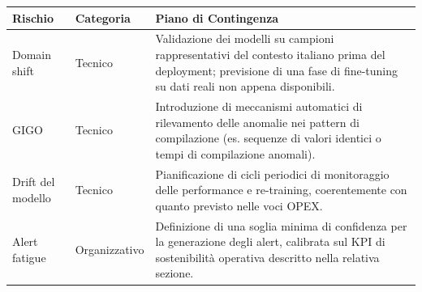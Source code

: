 \vspace{0.3cm}
\begin{table}[h]
    \centering
    \renewcommand{\arraystretch}{1.5}
    \small
    \begin{tabular}{|p{}|p{}|p{}|}
        \hline
        \textbf{Rischio}           & \textbf{Categoria} & \textbf{Piano di Contingenza}                                                                                                                                                                                                                                                                                                                                                                                                              \\
        \hline
        Domain shift               & Tecnico            & Validazione dei modelli su campioni rappresentativi del contesto italiano prima del deployment; previsione di una fase di fine-tuning su dati reali non appena disponibili.                                                                                                                                                                                                                                                                \\
        \hline
        GIGO                       & Tecnico            & Introduzione di meccanismi automatici di rilevamento delle anomalie nei pattern di compilazione (es. sequenze di valori identici o tempi di compilazione anomali).                                                                                                                                                                                                                                                                         \\
        \hline
        Drift del modello          & Tecnico            & Pianificazione di cicli periodici di monitoraggio delle performance e re-training, coerentemente con quanto previsto nelle voci OPEX.                                                                                                                                                                                                                                                                                                      \\
        \hline
        Alert fatigue              & Organizzativo      & Definizione di una soglia minima di confidenza per la generazione degli alert, calibrata sul KPI di sostenibilità operativa descritto nella relativa sezione.                                                                                                                                                                                                                                                                              \\

\end{tabular}
\end{table}
